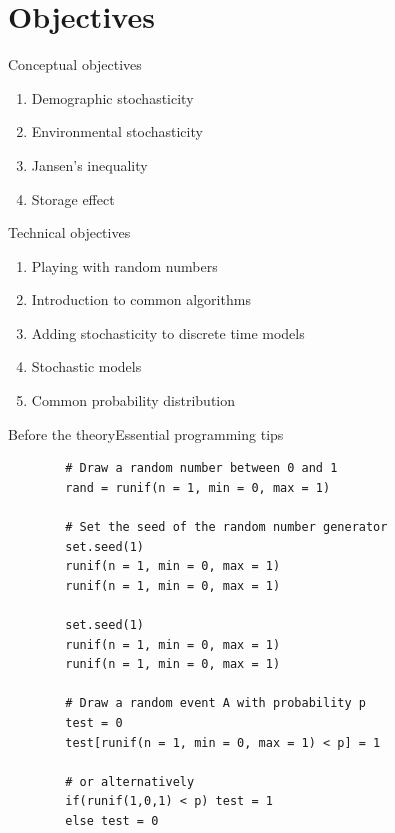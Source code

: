 \documentclass{eecslides}
\begin{document}

	\section{Objectives}

	\begin{frame}{Conceptual objectives}

	\begin{enumerate}
		\item Demographic stochasticity
		\item Environmental stochasticity
		\item Jansen's inequality
		\item Storage effect
	\end{enumerate}

	\end{frame}


	\begin{frame}{Technical objectives}

	\begin{enumerate}
		\item Playing with random numbers
		\item Introduction to common algorithms
		\item Adding stochasticity to discrete time models
		\item Stochastic models
		\item Common probability distribution 
	\end{enumerate}

	\end{frame}

	\begin{frame}[fragile]{Before the theory}{Essential programming tips}

		\begin{lstlisting}
		# Draw a random number between 0 and 1
		rand = runif(n = 1, min = 0, max = 1)

		# Set the seed of the random number generator
		set.seed(1)
		runif(n = 1, min = 0, max = 1)
		runif(n = 1, min = 0, max = 1)

		set.seed(1)
		runif(n = 1, min = 0, max = 1)
		runif(n = 1, min = 0, max = 1)

		# Draw a random event A with probability p 
		test = 0
		test[runif(n = 1, min = 0, max = 1) < p] = 1 
		
		# or alternatively
		if(runif(1,0,1) < p) test = 1 
		else test = 0

		\end{lstlisting}

	\end{frame}
\end{document}
